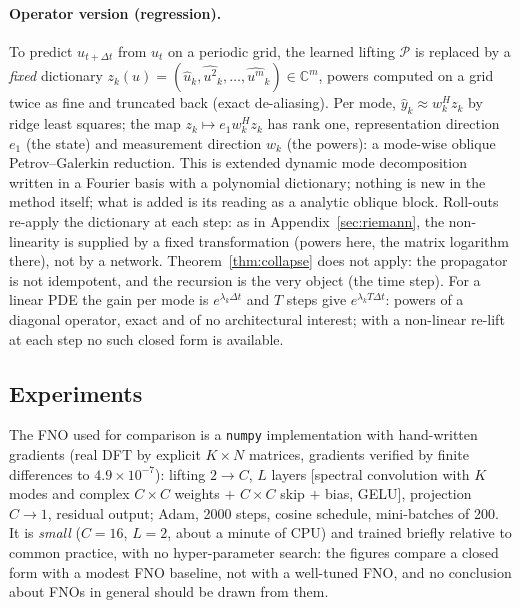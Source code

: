 \documentclass[11pt,a4paper]{article}
\theoremstyle{plain}
\theoremstyle{definition}
\theoremstyle{remark}
\newcommand{\Cx}{\mathbb C}
\begin{document}
\paragraph{Operator version (regression).} To predict $u_{t+\Delta t}$ from
$u_t$ on a periodic grid, the learned lifting $\mathcal P$ is replaced by a
\emph{fixed} dictionary $z_k(u)=(\hat u_k,\widehat{u^2}_k,\dots,\widehat{u^m}_k)\in\Cx^m$,
powers computed on a grid twice as fine and truncated back (exact
de-aliasing). Per mode, $\hat y_k\approx w_k^Hz_k$ by ridge least squares;
the map $z_k\mapsto e_1w_k^Hz_k$ has rank one, representation direction
$e_1$ (the state) and measurement direction $w_k$ (the powers): a
mode-wise oblique Petrov--Galerkin reduction. This is extended dynamic mode
decomposition~\cite{williams2015edmd} written in a Fourier basis with a
polynomial dictionary;
nothing is new in the method itself; what is added is its reading as a
analytic oblique block. Roll-outs
re-apply the dictionary at each step: as in Appendix~\ref{sec:riemann}, the
non-linearity is supplied by a fixed transformation (powers here, the matrix
logarithm there), not by a network. Theorem~\ref{thm:collapse} does not
apply: the propagator is not idempotent, and the recursion is the very object
(the time step). For a linear PDE the gain per mode is $e^{\lambda_k\Delta t}$
and $T$ steps give $e^{\lambda_kT\Delta t}$: powers of a diagonal operator,
exact and of no architectural interest; with a non-linear re-lift at each
step no such closed form is available.

\subsection{Experiments}
The FNO used for comparison is a \texttt{numpy} implementation with
hand-written gradients (real DFT by explicit $K\times N$ matrices, gradients
verified by finite differences to $4.9\times10^{-7}$): lifting $2\to C$, $L$
layers [spectral convolution with $K$ modes and complex $C\times C$ weights
$+$ $C\times C$ skip $+$ bias, GELU], projection $C\to1$, residual output;
Adam, 2000 steps, cosine schedule, mini-batches of 200. It is \emph{small}
($C=16$, $L=2$, about a minute of CPU) and trained briefly relative to
common practice, with no hyper-parameter search: the figures compare a
closed form with a modest FNO baseline, not with a well-tuned FNO, and no
conclusion about FNOs in general should be drawn from them.
\end{document}
